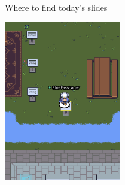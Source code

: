 \begin{frame}{Where to find today's slides}

\begin{center}
 \includegraphics[height=7cm]{pics/slides_final.png}
\end{center}

\end{frame}
